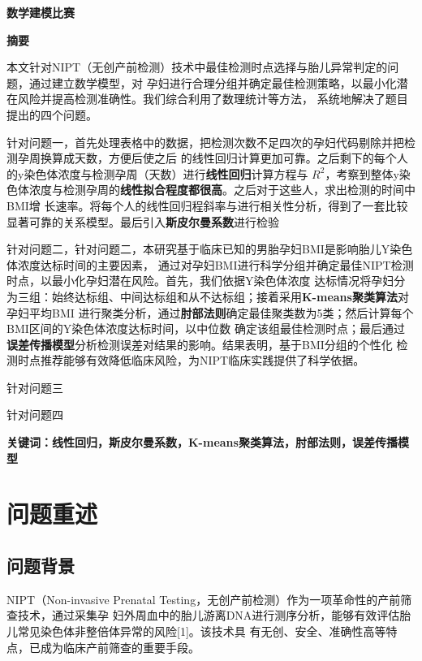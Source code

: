 \documentclass{article}
\date{}
\begin{document}
\vspace{-30pt}
\begin{center}
    \Large \textbf{数学建模比赛}  %
\end{center}
\vspace{-13pt}
\begin{center}
    \large \textbf{摘要}  %
\end{center}
\qquad 本文针对NIPT（无创产前检测）技术中最佳检测时点选择与胎儿异常判定的问题，通过建立数学模型，对
孕妇进行合理分组并确定最佳检测策略，以最小化潜在风险并提高检测准确性。我们综合利用了数理统计等方法，
系统地解决了题目提出的四个问题。

针对问题一，首先处理表格中的数据，把检测次数不足四次的孕妇代码剔除并把检测孕周换算成天数，方便后使之后
的线性回归计算更加可靠。之后剩下的每个人的y染色体浓度与检测孕周（天数）进行\textbf{线性回归}计算方程与
$R^2$，考察到整体y染色体浓度与检测孕周的\textbf{线性拟合程度都很高}。之后对于这些人，求出检测的时间中BMI增
长速率。将每个人的线性回归程斜率与进行相关性分析，得到了一套比较显著可靠的关系模型。最后引入\textbf{斯皮尔曼系数}进行检验

针对问题二，针对问题二，本研究基于临床已知的男胎孕妇BMI是影响胎儿Y染色体浓度达标时间的主要因素，
通过对孕妇BMI进行科学分组并确定最佳NIPT检测时点，以最小化孕妇潜在风险。首先，我们依据Y染色体浓度
达标情况将孕妇分为三组：始终达标组、中间达标组和从不达标组；接着采用\textbf{K-means聚类算法}对孕妇平均BMI
进行聚类分析，通过\textbf{肘部法则}确定最佳聚类数为5类；然后计算每个BMI区间的Y染色体浓度达标时间，以中位数
确定该组最佳检测时点；最后通过\textbf{误差传播模型}分析检测误差对结果的影响。结果表明，基于BMI分组的个性化
检测时点推荐能够有效降低临床风险，为NIPT临床实践提供了科学依据。

针对问题三

针对问题四

\textbf{关键词：线性回归，斯皮尔曼系数，K-means聚类算法，肘部法则，误差传播模型}
\newpage
\section{\textbf{问题重述}}
\subsection{\textbf{问题背景}}
NIPT（Non-invasive Prenatal Testing，无创产前检测）作为一项革命性的产前筛查技术，通过采集孕
妇外周血中的胎儿游离DNA进行测序分析，能够有效评估胎儿常见染色体非整倍体异常的风险[1]。该技术具
有无创、安全、准确性高等特点，已成为临床产前筛查的重要手段。
\end{document}
